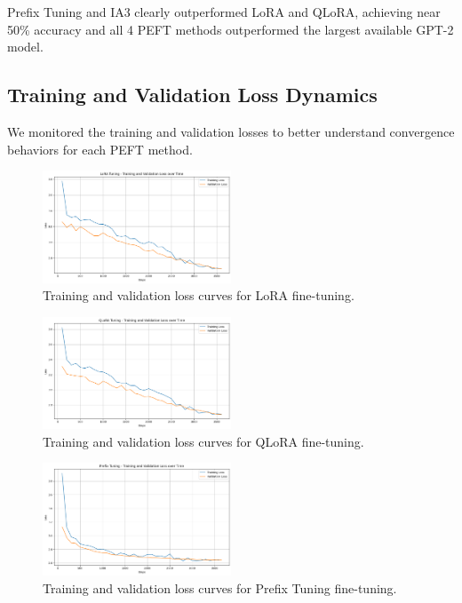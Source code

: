 \documentclass[11pt,twocolumn]{article}
\begin{document}
Prefix Tuning and IA3 clearly outperformed LoRA and QLoRA, achieving near 50\% accuracy and all 4 PEFT methods outperformed the largest available GPT-2 model.

\subsection{Training and Validation Loss Dynamics}
We monitored the training and validation losses to better understand convergence behaviors for each PEFT method.

\begin{figure}[h]
\centering
\includegraphics[width=0.5\textwidth]{../graphs/LoRA.png}
\caption{Training and validation loss curves for LoRA fine-tuning.}
\label{fig:lora-loss}
\end{figure}

\begin{figure}[h]
\centering
\includegraphics[width=0.5\textwidth]{../graphs/QLoRA.png}
\caption{Training and validation loss curves for QLoRA fine-tuning.}
\label{fig:qlora-loss}
\end{figure}

\begin{figure}[h]
\centering
\includegraphics[width=0.5\textwidth]{../graphs/Prefix.png}
\caption{Training and validation loss curves for Prefix Tuning fine-tuning.}
\label{fig:prefix-loss}
\end{figure}
\end{document}
